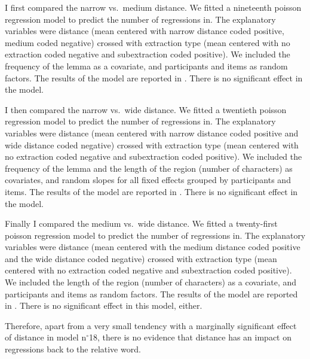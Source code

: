 I first compared the narrow vs.\ medium distance. We fitted a nineteenth poisson regression model to predict the number of regressions in. The explanatory variables were distance (mean centered with narrow distance coded positive, medium coded negative) crossed with extraction type (mean centered with no extraction coded negative and subextraction coded positive). We included the frequency of the lemma as a covariate, and participants and items as random factors. 
The results of the model are reported in . There is no significant effect in the model.



I then compared the narrow vs.\ wide distance. We fitted a twentieth poisson regression model to predict the number of regressions in. The explanatory variables were distance (mean centered with narrow distance coded positive and wide distance coded negative) crossed with extraction type (mean centered with no extraction coded negative and subextraction coded positive). We included the frequency of the lemma and the length of the region (number of characters) as covariates, and random slopes for all fixed effects grouped by participants and items. 
The results of the model are reported in . There is no significant effect in the model.



Finally I compared the medium vs.\ wide distance. We fitted a twenty-first poisson regression model to predict the number of regressions in. The explanatory variables were distance (mean centered with the medium distance coded positive and the wide distance coded negative) crossed with extraction type (mean centered with no extraction coded negative and subextraction coded positive). We included the length of the region  (number of characters) as a covariate, and participants and items as random factors. 
The results of the model are reported in . There is no significant effect in this model, either.



Therefore, apart from a very small tendency with a marginally significant effect of distance in model n$^{\circ}$18, there is no evidence that distance has an impact on regressions back to the relative word. 
